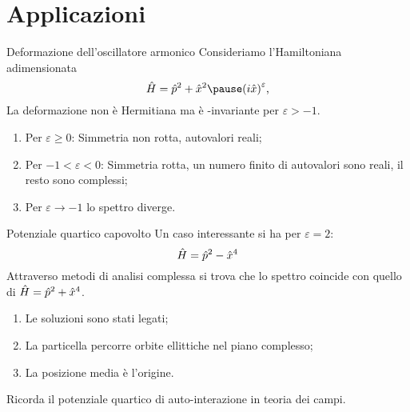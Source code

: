 \section{Applicazioni}
\begin{frame}{Deformazione dell'oscillatore armonico}
    Consideriamo l'Hamiltoniana adimensionata
    \begin{equation*}
        \hH = \hp^2 + \hx^2\pause\pqty{i\hx}^\varepsilon
        \mycomma
    \end{equation*}
    La deformazione non è Hermitiana ma è \PT-invariante per $\varepsilon > -1$.

    \begin{enumerate}[label=\mybullet]
        \pause
        \item Per $\varepsilon \geq 0$: Simmetria non rotta, autovalori reali;
        \pause
        \item Per $-1 < \varepsilon < 0$: Simmetria rotta, un numero finito di autovalori sono reali, il resto sono complessi;
        \pause
        \item Per $\varepsilon \to -1$ lo spettro diverge. 
    \end{enumerate}
\end{frame}

\begin{frame}{Potenziale quartico capovolto}
    Un caso interessante si ha per $\varepsilon = 2$:
    \begin{equation*}
        \hat{H} = \hat{p}^2 - \hat{x}^4
    \end{equation*}
    \pause
    Attraverso metodi di analisi complessa si trova che lo spettro coincide con quello di $\hat{H} = \hat{p}^2 + \hat{x}^4$.
    \begin{enumerate}[label=\mybullet]
        \pause
        \item  Le soluzioni sono stati legati;
        \pause
        \item La particella percorre orbite ellittiche nel piano complesso;
        \pause
        \item La posizione media è l'origine. 
    \end{enumerate}
    Ricorda il potenziale quartico di auto-interazione in teoria dei campi.
\end{frame}